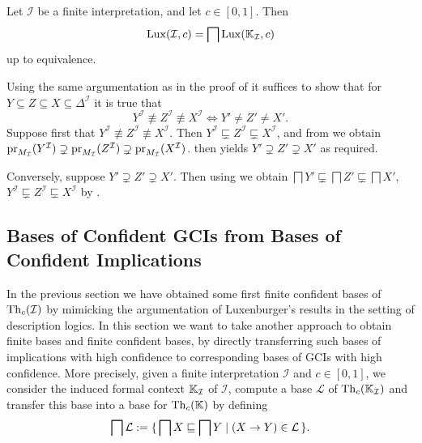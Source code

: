 \begin{Corollary}
  \label{cor:Lux-from-K_I}
  Let $\mathcal{I}$ be a finite interpretation, and let $c \in [0,1]$.  Then
  \begin{equation*}
    \operatorname{Lux}(\mathcal{I}, c) = \bigsqcap \operatorname{Lux}({\mathbb{K}}_{\mathcal{I}}, c)
  \end{equation*}
  up to equivalence.
\end{Corollary}
\begin{Proof}
  Using the same argumentation as in the proof of  it suffices to
  show that for $Y \subseteq Z \subseteq X \subseteq \Delta^{\mathcal{I}}$ it is true that
  \begin{equation}
    \label{eq:32}
    Y^{\mathcal{I}} \not\equiv Z^{\mathcal{I}} \not\equiv X^{\mathcal{I}} \iff Y' \neq Z'
    \neq X'.
  \end{equation}
  Suppose first that $Y^{\mathcal{I}} \not\equiv Z^{\mathcal{I}} \not\equiv
  X^{\mathcal{I}}$.  Then $Y^{\mathcal{I}} \sqsubsetneq Z^{\mathcal{I}} \sqsubsetneq
  X^{\mathcal{I}}$, and from  we
  obtain $\operatorname{pr}_{M_{\mathcal{I}}}(Y^{\mathcal{I}}) \supsetneq \operatorname{pr}_{M_{\mathcal{I}}}(Z^{\mathcal{I}})
  \supsetneq \operatorname{pr}_{M_{\mathcal{I}}}(X^{\mathcal{I}})$.  
  then yields $Y' \supsetneq Z' \supsetneq X'$ as required.

  Conversely, suppose $Y' \supsetneq Z' \supsetneq X'$.  Then using
   we obtain $\bigsqcap Y'
  \sqsubsetneq \bigsqcap Z' \sqsubsetneq \bigsqcap X'$, \ie $Y^{\mathcal{I}} \sqsubsetneq
  Z^{\mathcal{I}} \sqsubsetneq X^{\mathcal{I}}$ by .
\end{Proof}

\subsection{Bases of Confident GCIs from Bases of Confident Implications}
\label{sec:bases-confident-gcis}

In the previous section we have obtained some first finite confident bases of
$\operatorname{Th}_c(\mathcal{I})$ by mimicking the argumentation of Luxenburger's results in the
setting of description logics.  In this section we want to take another approach to obtain
finite bases and finite confident bases, by directly transferring such bases of
implications with high confidence to corresponding bases of GCIs with high confidence.
More precisely, given a finite interpretation $\mathcal{I}$ and $c \in [0,1]$, we consider
the induced formal context ${\mathbb{K}}_{\mathcal{I}}$ of $\mathcal{I}$, compute a base
$\mathcal{L}$ of $\operatorname{Th}_c({\mathbb{K}}_{\mathcal{I}})$ and transfer this base into a base for
$\operatorname{Th}_c({\mathbb{K}})$ by defining
\begin{equation*}
  \bigsqcap \mathcal{L} := {\{\, \bigsqcap X \sqsubseteq \bigsqcap Y \mid (X \to Y) \in
    \mathcal{L} \,\}}.
\end{equation*}

